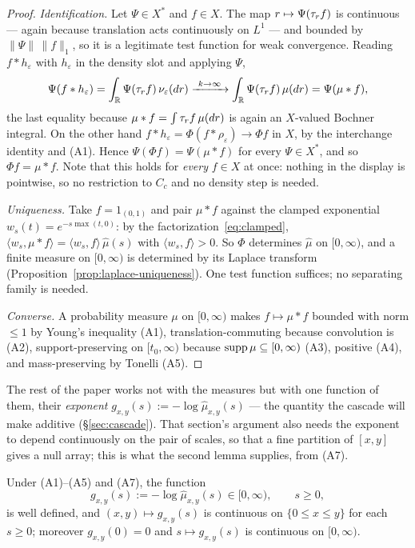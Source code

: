 \begin{proof}
\emph{Identification.} Let $\Psi \in X^*$ and $f \in X$. The map $r \mapsto \Psi(\tau_r f)$
is continuous --- again because translation acts continuously on $L^1$ --- and bounded by
$\|\Psi\|\,\|f\|_1$, so it is a legitimate test function for weak convergence. Reading
$f * h_\varepsilon$ with $h_\varepsilon$ in the density slot and applying $\Psi$,
\[
  \Psi(f * h_\varepsilon) = \int_{\mathbb{R}} \Psi(\tau_r f)\,\nu_\varepsilon(dr)
  \xrightarrow{\ k \to \infty\ } \int_{\mathbb{R}} \Psi(\tau_r f)\,\mu(dr) = \Psi(\mu * f),
\]
the last equality because $\mu * f = \int \tau_r f\,\mu(dr)$ is again an $X$-valued Bochner
integral. On the other hand $f * h_\varepsilon = \Phi(f * \rho_\varepsilon) \to \Phi f$ in $X$,
by the interchange identity and (A1). Hence $\Psi(\Phi f) = \Psi(\mu * f)$ for every
$\Psi \in X^*$, and so $\Phi f = \mu * f$. Note that this holds for \emph{every} $f \in X$ at
once: nothing in the display is pointwise, so no restriction to $C_c$ and no density step is
needed.

\emph{Uniqueness.} Take $f = 1_{(0,1)}$ and pair $\mu * f$ against the clamped
exponential $w_s(t) = e^{-s\max(t,0)}$: by the factorization~\eqref{eq:clamped},
$\langle w_s, \mu * f\rangle = \langle w_s, f\rangle\,\hat\mu(s)$ with
$\langle w_s, f\rangle > 0$. So $\Phi$ determines $\hat\mu$ on $[0,\infty)$, and a finite
measure on $[0,\infty)$ is determined by its Laplace transform
(Proposition~\ref{prop:laplace-uniqueness}). One test function suffices; no separating
family is needed.

\emph{Converse.} A probability measure $\mu$ on $[0,\infty)$ makes $f \mapsto \mu * f$ bounded
with norm $\le 1$ by Young's inequality (A1), translation-commuting because convolution is
(A2), support-preserving on $[t_0,\infty)$ because $\operatorname{supp}\mu \subseteq [0,\infty)$ (A3),
positive (A4), and mass-preserving by Tonelli (A5).
\end{proof}

The rest of the paper works not with the measures but with one function of them, their
\emph{exponent} $g_{x,y}(s) := -\log\hat\mu_{x,y}(s)$ --- the quantity the cascade will
make additive (\S\ref{sec:cascade}). That section's argument also needs the exponent to
depend continuously on the pair of scales, so that a fine partition of $[x,y]$ gives a null
array; this is what the second lemma supplies, from (A7).

\begin{lemma}\label{lem:transform-continuity}
Under (A1)--(A5) and (A7), the function
\[
  g_{x,y}(s) := -\log \hat\mu_{x,y}(s) \in [0,\infty), \qquad s \ge 0,
\]
is well defined, and $(x,y) \mapsto g_{x,y}(s)$ is continuous on $\{0 \le x \le y\}$ for each
$s \ge 0$; moreover $g_{x,y}(0) = 0$ and $s \mapsto g_{x,y}(s)$ is continuous on
$[0,\infty)$.
\end{lemma}

